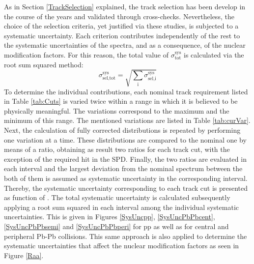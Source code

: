 \documentclass[12pt,a4paper]{report}
\begin{document}
As in Section \ref{TrackSelection} explained, the track selection has been develop in the course of the years and validated through cross-checks. Nevertheless, the choice of the selection criteria, yet justified via these studies, is subjected to a systematic uncertainty. Each criterion contributes independently of the rest to the systematic uncertainties of the \pt spectra, and as a consequence, of the nuclear modification factors. For this reason, the total value of $\sigma^\text{sys}_\text{tot}$ is calculated via the root sum squared method:
\begin{equation}
\sigma^\text{sys}_\text{sel,tot} = \sqrt{\sum_{\text{i}}\sigma^\text{sys}_\text{sel,i}}
\end{equation} 
To determine the individual contributions, each nominal track requirement listed in Table \ref{tab:Cuts} is varied twice within a range in which it is believed to be physically meaningful. The variations correspond to the maximum and the minimum of this range. The mentioned variations are listed in Table \ref{tab:curVar}. Next, the calculation of fully corrected \pt distributions is repeated by performing one variation at a time. These \pt distributions are compared to the nominal one by means of a ratio, obtaining as result two ratios for each track cut, with the exception of the required hit in the SPD. Finally, the two ratios are evaluated in each \pt interval and the largest deviation from the nominal \pt spectrum between the both of them is assumed as systematic uncertainty in the corresponding \pt interval. Thereby, the systematic uncertainty corresponding to each track cut is presented as function of \pt. The total systematic uncertainty is calculated subsequently applying a root sum squared in each \pt interval among the individual systematic uncertainties. This is given in Figures \ref{SysUncpp}, \ref{SysUncPbPbcent}, \ref{SysUncPbPbsemi} and \ref{SysUncPbPbperi} for pp as well as for central and peripheral Pb-Pb collisions. This same approach is also applied to determine the systematic uncertainties that affect the nuclear modification factors as seen in Figure \ref{Raa}.
\end{document}
